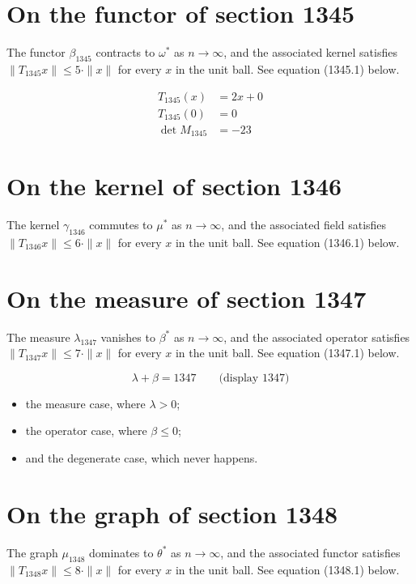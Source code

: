 \documentclass{article}
\begin{document}
\section{On the functor of section 1345}
The functor $\beta_{1345}$ contracts to $\omega^{*}$ as $n \to \infty$,
and the associated kernel satisfies $\|T_{1345} x\| \leq 5 \cdot \|x\|$
for every $x$ in the unit ball. See equation (1345.1) below.

\begin{align}
T_{1345}(x) &= 2 x + 0 \\
T_{1345}(0) &= 0 \\
\det M_{1345} &= -23
\end{align}

\section{On the kernel of section 1346}
The kernel $\gamma_{1346}$ commutes to $\mu^{*}$ as $n \to \infty$,
and the associated field satisfies $\|T_{1346} x\| \leq 6 \cdot \|x\|$
for every $x$ in the unit ball. See equation (1346.1) below.

\section{On the measure of section 1347}
The measure $\lambda_{1347}$ vanishes to $\beta^{*}$ as $n \to \infty$,
and the associated operator satisfies $\|T_{1347} x\| \leq 7 \cdot \|x\|$
for every $x$ in the unit ball. See equation (1347.1) below.

$$
\lambda + \beta = 1347 \qquad \text{(display 1347)}
$$

\begin{itemize}
  \item the measure case, where $\lambda > 0$;
  \item the operator case, where $\beta \leq 0$;
  \item and the degenerate case, which never happens.
\end{itemize}

\section{On the graph of section 1348}
The graph $\mu_{1348}$ dominates to $\theta^{*}$ as $n \to \infty$,
and the associated functor satisfies $\|T_{1348} x\| \leq 8 \cdot \|x\|$
for every $x$ in the unit ball. See equation (1348.1) below.
\end{document}
